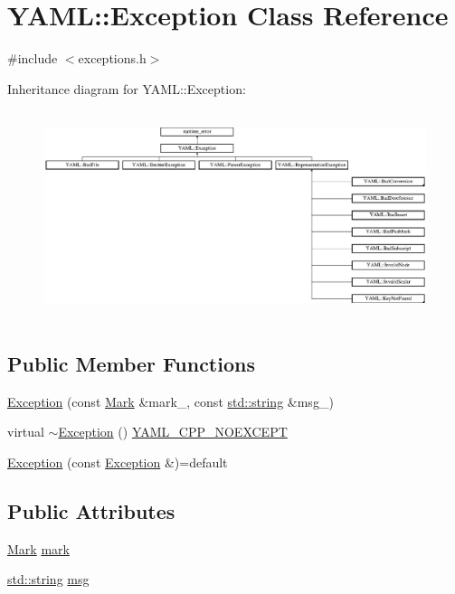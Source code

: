 \hypertarget{class_y_a_m_l_1_1_exception}{}\section{Y\+A\+ML\+::Exception Class Reference}
\label{class_y_a_m_l_1_1_exception}


{\ttfamily \#include $<$exceptions.\+h$>$}

Inheritance diagram for Y\+A\+ML\+::Exception\+:\begin{figure}[H]
\begin{center}
\leavevmode
\includegraphics[height=6.129353cm]{class_y_a_m_l_1_1_exception}
\end{center}
\end{figure}
\subsection*{Public Member Functions}
\begin{DoxyCompactItemize}
\item 
\mbox{\hyperlink{class_y_a_m_l_1_1_exception_a6f03669b679e99bb51ee69a562ed7d77}{Exception}} (const \mbox{\hyperlink{struct_y_a_m_l_1_1_mark}{Mark}} \&mark\+\_\+, const \mbox{\hyperlink{glad_8h_ac83513893df92266f79a515488701770}{std\+::string}} \&msg\+\_\+)
\item 
virtual \mbox{\hyperlink{class_y_a_m_l_1_1_exception_ae2964297ac5df854a9df0b4de255f86c}{$\sim$\+Exception}} () \mbox{\hyperlink{exceptions_8cpp_a4ea58eb0a28000364858d4942add7d1a}{Y\+A\+M\+L\+\_\+\+C\+P\+P\+\_\+\+N\+O\+E\+X\+C\+E\+PT}}
\item 
\mbox{\hyperlink{class_y_a_m_l_1_1_exception_a197a81d38440637a7589e94a1b41929a}{Exception}} (const \mbox{\hyperlink{class_y_a_m_l_1_1_exception}{Exception}} \&)=default
\end{DoxyCompactItemize}
\subsection*{Public Attributes}
\begin{DoxyCompactItemize}
\item 
\mbox{\hyperlink{struct_y_a_m_l_1_1_mark}{Mark}} \mbox{\hyperlink{class_y_a_m_l_1_1_exception_aae9d515164d1ff4bbc26aee3abe073fa}{mark}}
\item 
\mbox{\hyperlink{glad_8h_ac83513893df92266f79a515488701770}{std\+::string}} \mbox{\hyperlink{class_y_a_m_l_1_1_exception_a5de66d8f62317e66d2f2c4386b325d29}{msg}}
\end{DoxyCompactItemize}



